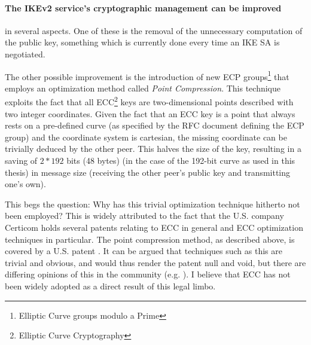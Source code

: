 \documentclass[final,a4paper,twoside,11pt,onecolumn]{report}
\begin{document}
\paragraph{The IKEv2 service's cryptographic management can be improved} in several aspects. One of these is the removal of the unnecessary computation of the public key, something which is currently done every time an IKE SA is negotiated.

The other possible improvement is the introduction of new ECP groups\footnote{Elliptic Curve groups modulo a Prime} that employs an optimization method called \emph{Point Compression}. This technique exploits the fact that all ECC\footnote{Elliptic Curve Cryptography} keys are two-dimensional points described with two integer coordinates. Given the fact that an ECC key is a point that always rests on a pre-defined curve (as specified by the RFC document defining the ECP group) and the coordinate system is cartesian, the missing coordinate can be trivially deduced by the other peer. This halves the size of the key, resulting in a saving of $2*192$ bits (48 bytes) (in the case of the 192-bit curve as used in this thesis) in message size (receiving the other peer's public key and transmitting one's own).

This begs the question: Why has this trivial optimization technique hitherto not been employed? This is widely attributed to the fact that the U.S. company Certicom holds several patents relating to ECC in general and ECC optimization techniques in particular. The point compression method, as described above, is covered by a U.S. patent \cite{agnew2000elliptic}. It can be argued that techniques such as this are trivial and obvious, and would thus render the patent null and void, but there are differing opinions of this in the community (e.g. \cite{bernstein}). I believe that ECC has not been widely adopted as a direct result of this legal limbo.

%
%
\end{document}

